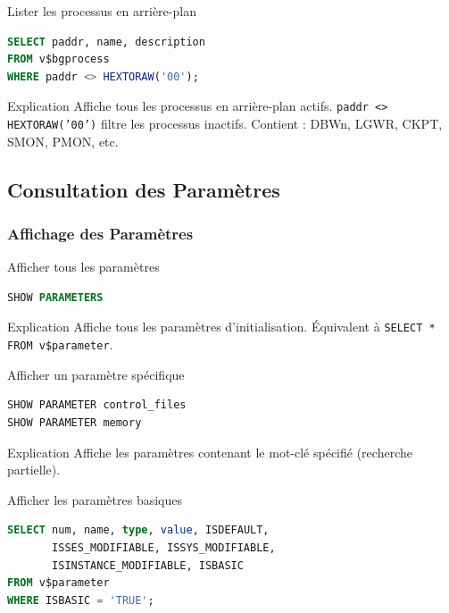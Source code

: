 \documentclass[12pt,a4paper]{article}
\begin{document}
\begin{commande}{Lister les processus en arrière-plan}
\begin{lstlisting}[language=SQL]
SELECT paddr, name, description
FROM v$bgprocess
WHERE paddr <> HEXTORAW('00');
\end{lstlisting}
\end{commande}

\begin{explication}{Explication}
Affiche tous les processus en arrière-plan actifs. \texttt{paddr <> HEXTORAW('00')} filtre les processus inactifs. Contient : DBWn, LGWR, CKPT, SMON, PMON, etc.
\end{explication}

\subsection{Consultation des Paramètres}

\subsubsection{Affichage des Paramètres}

\begin{commande}{Afficher tous les paramètres}
\begin{lstlisting}[language=SQL]
SHOW PARAMETERS
\end{lstlisting}
\end{commande}

\begin{explication}{Explication}
Affiche tous les paramètres d'initialisation. Équivalent à \texttt{SELECT * FROM v\$parameter}.
\end{explication}

\begin{commande}{Afficher un paramètre spécifique}
\begin{lstlisting}[language=SQL]
SHOW PARAMETER control_files
SHOW PARAMETER memory
\end{lstlisting}
\end{commande}

\begin{explication}{Explication}
Affiche les paramètres contenant le mot-clé spécifié (recherche partielle).
\end{explication}

\begin{commande}{Afficher les paramètres basiques}
\begin{lstlisting}[language=SQL]
SELECT num, name, type, value, ISDEFAULT, 
       ISSES_MODIFIABLE, ISSYS_MODIFIABLE, 
       ISINSTANCE_MODIFIABLE, ISBASIC
FROM v$parameter
WHERE ISBASIC = 'TRUE';
\end{lstlisting}
\end{commande}
\end{document}
